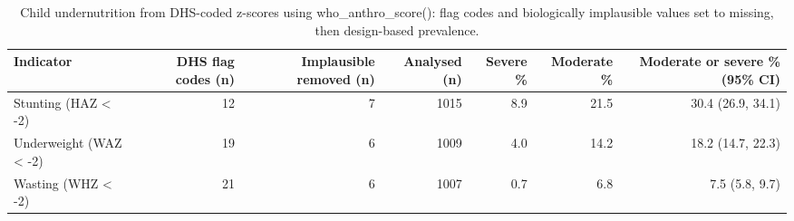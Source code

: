 \begin{table}[htbp]

\caption{\label{tab:tab_anthropometry}Child undernutrition from DHS-coded z-scores using who\_anthro\_score(): flag codes and biologically implausible values set to missing, then design-based prevalence.}
\centering
\footnotesize\setlength{\tabcolsep}{3pt}
\begin{adjustbox}{max width=\linewidth}
\begin{tabular}{lrrrrrr}
\toprule
Indicator & DHS flag codes (n) & Implausible removed (n) & Analysed (n) & Severe \% & Moderate \% & Moderate or severe \% (95\% CI)\\
\midrule
Stunting (HAZ < -2) & 12 & 7 & 1015 & 8.9 & 21.5 & 30.4 (26.9, 34.1)\\
Underweight (WAZ < -2) & 19 & 6 & 1009 & 4.0 & 14.2 & 18.2 (14.7, 22.3)\\
Wasting (WHZ < -2) & 21 & 6 & 1007 & 0.7 & 6.8 & 7.5 (5.8, 9.7)\\
\bottomrule
\end{tabular}
\end{adjustbox}
\end{table}
